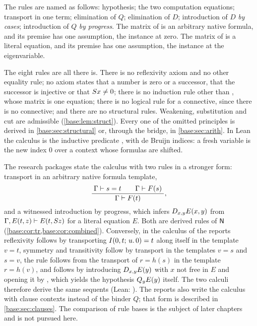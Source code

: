 The rules are named as follows: hypothesis; the two computation equations;
transport in one term; elimination of $Q$; elimination of $D$;
introduction of $D$ \emph{by cases}; introduction of $Q$ \emph{by
progress}.  The matrix of  is an arbitrary native formula, and
its premise has one assumption, the instance at zero.  The matrix of
 is a literal equation, and its premise has one assumption, the
instance at the eigenvariable.

\begin{remark}
\label{base:rem:inventory}
The eight rules are all there is.  There is no reflexivity axiom and no
other equality rule; no axiom states that a number is zero or a successor,
that the successor is injective or that $S x\neq 0$; there is no
induction rule other than , whose matrix is one equation; there
is no logical rule for a connective, since there is no connective; and there
are no structural rules.  Weakening, substitution and cut are admissible
(\cref{base:lem:struct}).  Every one of the omitted principles is derived in
\cref{base:sec:structural} or, through the bridge, in \cref{base:sec:arith}.
In Lean the calculus is the inductive predicate , with de Bruijn
indices: a fresh variable is the new index $0$ over a context whose formulas
are shifted.
\end{remark}

\begin{remark}
\label{base:rem:reports}
The research packages state the calculus with two rules in a stronger form:
transport in an arbitrary native formula template,
\[
 \dfrac{\;\Gamma\vdash s=t\qquad\Gamma\vdash F(s)\;}{\;\Gamma\vdash F(t)\;},
\]
and a witnessed introduction by progress, which infers $D_{x,y}E(x,y)$ from
$\Gamma,E(t,z)\vdash E(t,S z)$ for a literal equation $E$.  Both are
derived rules of $\mathsf{N}$ (\cref{base:cor:tr,base:cor:combined}).  Conversely,
in the calculus of the reports reflexivity follows by transporting
$I(0,t;\,u.\,0)=t$ along itself in the template $v=t$, symmetry and
transitivity follow by transport in the templates $v=s$ and $s=v$, the rule
 follows from the transport of $r=h(s)$ in the template
$r=h(v)$, and  follows by introducing $D_{x,y}E(y)$ with $x$
not free in $E$ and opening it by , which yields the hypothesis
$Q_{y}E(y)$ itself.  The two calculi therefore derive the same sequents
(Lean: ).  The reports also write the calculus with
clause contexts instead of the binder $Q$; that form is described in
\cref{base:sec:clauses}.  The comparison of rule bases is the subject of
later chapters and is not pursued here.
\end{remark}

